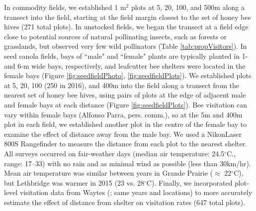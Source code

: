 \documentclass[12pt, draft]{article} %
\begin{document}
In commodity fields, we established 1 m$^2$ plots at 5, 20, 100, and 500m along a transect into the field, starting at the field margin closest to the set of honey bee hives (271 total plots). %
In unstocked fields, we began the transect at a field edge close to potential sources of natural pollinating insects, such as forests or grasslands, but observed very few wild pollinators (Table \ref{tab:propVisitors}).
In seed canola fields, bays of ``male" and ``female" plants are typically planted in 1- and 6-m wide bays, respectively, and leafcutter bee shelters were located in the female bays (Figure \ref{fig:seedfieldPhoto}, \ref{fig:seedfieldPlots}).
We established plots at 5, 20, 100 (250 in 2016), and 400m into the field along a transect from the nearest set of honey bee hives, using pairs of plots at the edge of adjacent male and female bays at each distance (Figure \ref{fig:seedfieldPlots}).
Bee visitation can vary within female bays (Alfonso Parra, pers. comm.), so at the 5m and 400m plot in each field, we established another plot in the centre of the female bay to examine the effect of distance away from the male bay.
We used a Nikon\texttrademark Laser 800S Rangefinder to measure the distance from each plot to the nearest shelter.
All surveys occurred on fair-weather days (median air temperature: 24.5$^\circ$C., range: 17--33) with no rain and as minimal wind as possible (less than 30km/hr).
Mean air temperature was similar between years in Grande Prairie ($\approx$ 22$^\circ$C), but Lethbridge was warmer in 2015 (23 vs. 28$^\circ$C).
Finally, we incorporated plot-level visitation data from Waytes (\citeyear{waytesMsc}; same years and locations) to more accurately estimate the effect of distance from shelter on visitation rates (647 total plots).
\end{document}
